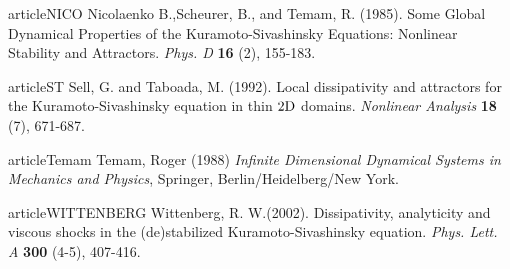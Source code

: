 article{NICO}
Nicolaenko B.,Scheurer, B., and Temam, R. (1985).
Some Global Dynamical Properties of the Kuramoto-Sivashinsky Equations: Nonlinear Stability and Attractors.
{\it Phys. D}
{\bf 16} (2), 155-183.

article{ST} Sell, G. and Taboada, M. (1992).
 Local dissipativity and attractors for the Kuramoto-Sivashinsky
equation in thin $2{\rm D}$ domains.
{\it Nonlinear Analysis} {\bf 18} (7), 671-687.

article{Temam}
Temam, Roger (1988)
{\itshape Infinite Dimensional Dynamical Systems in Mechanics and Physics},
Springer, Berlin/Heidelberg/New York.

article{WITTENBERG}
Wittenberg, R. W.(2002).
Dissipativity, analyticity and viscous shocks in the (de)stabilized
Kuramoto-Sivashinsky equation.
{\it Phys. Lett. A}
{\bf 300} (4-5), 407-416.
